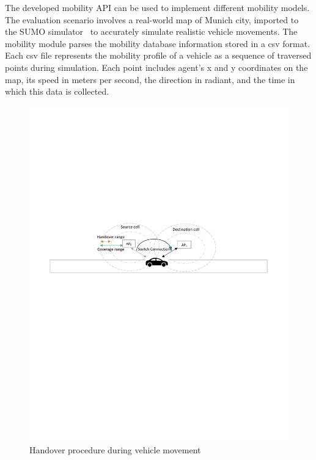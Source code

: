 \documentclass[conference]{IEEEtran}
\begin{document}
\par The developed mobility API can be used to implement different mobility models. The evaluation scenario involves a real-world map of Munich city, imported to the SUMO simulator~\cite{behrisch2011sumo} to accurately simulate realistic vehicle movements. The mobility module parses the mobility database information stored in a csv format.
Each csv file represents the mobility profile of a vehicle as a sequence of traversed points during simulation. Each point includes agent's x and y coordinates on the map, its speed in meters per second, the direction in radiant, and the time in which this data is collected.

\begin{figure}[!htb]
\centering
\includegraphics[clip, trim=5.5cm 14cm 6cm 9.5cm, width=0.9\columnwidth]{figures/immigration.pdf}
\caption{Handover procedure during vehicle movement}
\label{fig:mig}
\end{figure}
\end{document}
